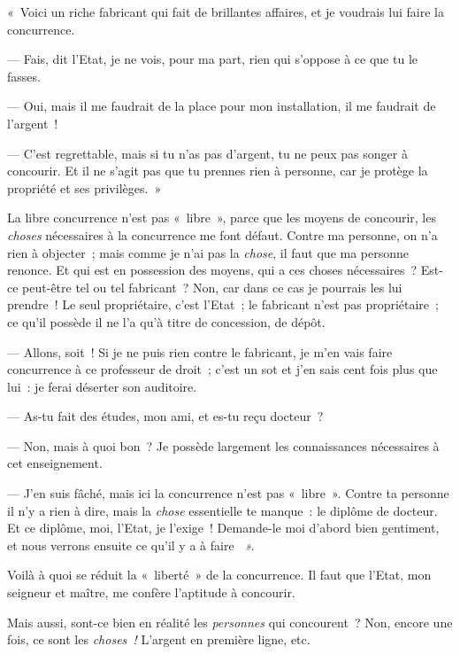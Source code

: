 \documentclass[french,twoside]{book} %
\begin{document}
« Voici un riche fabricant qui fait de brillantes affaires, et je voudrais lui faire la concurrence.\par
— Fais, dit l’Etat, je ne vois, pour ma part, rien qui s’oppose à ce que tu le fasses.\par
— Oui, mais il me faudrait de la place pour mon installation, il me faudrait de l’argent !\par
— C’est regrettable, mais si tu n’as pas d’argent, tu ne peux pas songer à concourir. Et il ne s’agit pas que tu prennes rien à personne, car je protège la propriété et ses privilèges. »\par
La libre concurrence n’est pas « libre », parce que les moyens de concourir, les \emph{choses} nécessaires à la concurrence me font défaut. Contre ma personne, on n’a rien à objecter ; mais comme je n’ai pas la \emph{chose}, il faut que ma personne renonce. Et qui est en possession des moyens, qui a ces choses nécessaires ? Est-ce peut-être tel ou tel fabricant ? Non, car dans ce cas je pourrais les lui prendre ! Le seul propriétaire, c’est l’Etat ; le fabricant n’est pas propriétaire ; ce qu’il possède il ne l’a qu’à titre de concession, de dépôt.\par
— Allons, soit ! Si je ne puis rien contre le fabricant, je m’en vais faire concurrence à ce professeur de droit ; c’est un sot et j’en sais cent fois plus que lui : je ferai déserter son auditoire.\par
— As-tu fait des études, mon ami, et es-tu reçu docteur ?\par
— Non, mais à quoi bon ? Je possède largement les connaissances nécessaires à cet enseignement.\par
— J’en suis fâché, mais ici la concurrence n’est pas « libre ». Contre ta personne il n’y a rien à dire, mais la \emph{chose} essentielle te manque : le diplôme de docteur. Et ce diplôme, moi, l’Etat, je  l’exige ! Demande-le moi d’abord bien gentiment, et nous verrons ensuite ce qu’il y a à faire \emph{ ».}\par
Voilà à quoi se réduit la « liberté » de la concurrence. Il faut que l’Etat, mon seigneur et maître, me confère l’aptitude à concourir.\par
Mais aussi, sont-ce bien en réalité les \emph{personnes} qui concourent ? Non, encore une fois, ce sont les \emph{choses ! }L’argent en première ligne, etc.\par
\end{document}
